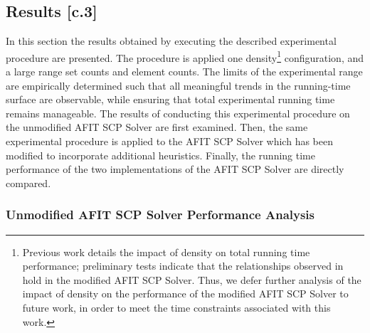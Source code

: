 \documentclass[12pt]{article}
\begin{document}
	
	\subsection{Results [c.3]}
	In this section the results obtained by executing the described experimental procedure are presented. The procedure is applied one density\footnote{Previous work \cite{hw5_knapp_fletcher_csce_686} details the impact of density on total running time performance; preliminary tests indicate that the relationships observed in \cite{hw5_knapp_fletcher_csce_686} hold in the modified AFIT SCP Solver. Thus, we defer further analysis of the impact of density on the performance of the modified AFIT SCP Solver to future work, in order to meet the time constraints associated with this work.} configuration, and a large range set counts and element counts. The limits of the experimental range are empirically determined such that all meaningful trends in the running-time surface are observable, while ensuring that total experimental running time remains manageable. The results of conducting this experimental procedure on the unmodified AFIT SCP Solver are first examined. Then, the same experimental procedure is applied to the AFIT SCP Solver which has been modified to incorporate additional heuristics. Finally, the running time performance of the two implementations of the AFIT SCP Solver are directly compared. 
	
	\subsubsection{Unmodified AFIT SCP Solver Performance Analysis}
	
\end{document}
